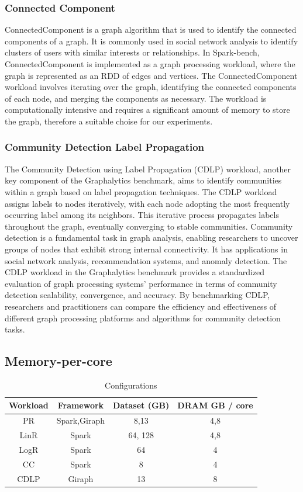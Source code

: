 \subsubsection{Connected Component}
ConnectedComponent is a graph algorithm that is used to identify the
connected components of a graph. It is commonly used in social network
analysis to identify clusters of users with similar interests or
relationships. In Spark-bench, ConnectedComponent is implemented as a
graph processing workload, where the graph is represented as an RDD of
edges and vertices. The ConnectedComponent workload involves iterating
over the graph, identifying the connected components of each node, and
merging the components as necessary. The workload is computationally
intensive and requires a significant amount of memory to store the
graph, therefore a suitable choise for our experiments.

\subsubsection{Community Detection Label Propagation}
The Community Detection using Label Propagation (CDLP) workload, another key component of the Graphalytics benchmark, aims to identify communities within a graph based on label propagation techniques. The CDLP workload assigns labels to nodes iteratively, with each node adopting the most frequently occurring label among its neighbors. This iterative process propagates labels throughout the graph, eventually converging to stable communities. Community detection is a fundamental task in graph analysis, enabling researchers to uncover groups of nodes that exhibit strong internal connectivity. It has applications in social network analysis, recommendation systems, and anomaly detection. The CDLP workload in the Graphalytics benchmark provides a standardized evaluation of graph processing systems' performance in terms of community detection scalability, convergence, and accuracy. By benchmarking CDLP, researchers and practitioners can compare the efficiency and effectiveness of different graph processing platforms and algorithms for community detection tasks.

\subsection{Memory-per-core}

\begin{table}[t!]
  \centering
  \caption{Configurations}
  \label{tab:setups}
  \begin{tabular}{|c|c|c|c|}
    \hline
	  \textbf{Workload} & \textbf{Framework} & \textbf{Dataset (GB)} & \textbf{DRAM GB / core} \\
    \hline
	  PR & Spark,Giraph & 8,13 & 4,8 \\
	  LinR & Spark & 64, 128 & 4,8 \\
    	LogR & Spark & 64 & 4 \\
	  CC & Spark & 8 & 4 \\
	  CDLP & Giraph & 13 & 8 \\
    \hline
  \end{tabular}
\end{table}


